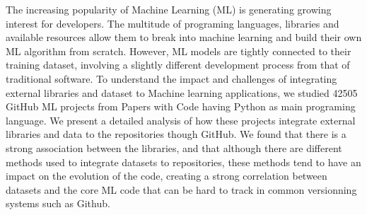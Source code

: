 \documentclass[../main.tex]{subfiles}
\begin{document}
    The increasing popularity of Machine Learning (ML) is generating growing interest for developers.
    The multitude of programing languages, libraries and available resources allow them to break into machine learning and build their own ML algorithm from scratch.
    However, ML models are tightly connected to their training dataset, involving a slightly different development process from that of traditional software.
    To understand the impact and challenges of integrating external libraries and dataset to Machine learning applications, we studied 42505 GitHub ML projects from Papers with Code having Python as main programing language.
    We present a detailed analysis of how these projects integrate external libraries and data to the repositories though GitHub.
    We found that there is a strong association between the libraries, and that although there are different methods used to integrate datasets to repositories, these methods tend to have an impact on the evolution of the code, creating a strong correlation between datasets and the core ML code that can be hard to track in common versionning systems such as Github.
\end{document}

